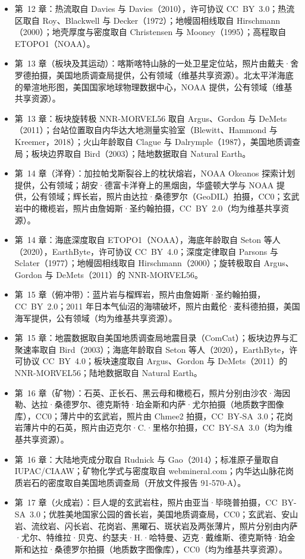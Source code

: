 \begin{itemize}
  \item 第~12 章：热流取自 Davies 与 Davies（2010），许可协议 CC~BY~3.0；热流区取自 Roy、Blackwell 与 Decker（1972）；地幔固相线取自 Hirschmann（2000）；地壳厚度与密度取自 Christensen 与 Mooney（1995）；高程取自 ETOPO1（NOAA）。
  \item 第~13 章（板块及其运动）：喀斯喀特山脉的一处卫星定位站，照片由戴夫·舍罗德拍摄，美国地质调查局提供，公有领域（维基共享资源）。北太平洋海底的晕渲地形图，美国国家地球物理数据中心，NOAA 提供，公有领域（维基共享资源）。
  \item 第~13 章：板块旋转极 NNR-MORVEL56 取自 Argus、Gordon 与 DeMets（2011）；台站位置取自内华达大地测量实验室（Blewitt、Hammond 与 Kreemer，2018）；火山年龄取自 Clague 与 Dalrymple（1987），美国地质调查局；板块边界取自 Bird（2003）；陆地数据取自 Natural Earth。
  \item 第~14 章（洋脊）：加拉帕戈斯裂谷上的枕状熔岩，NOAA Okeanos 探索计划提供，公有领域；胡安·德富卡洋脊上的黑烟囱，华盛顿大学与 NOAA 提供，公有领域；辉长岩，照片由达拉·桑德罗尔（GeoDIL）拍摄，CC0；玄武岩中的橄榄岩，照片由詹姆斯·圣约翰拍摄，CC~BY~2.0（均为维基共享资源）。
  \item 第~14 章：海底深度取自 ETOPO1（NOAA），海底年龄取自 Seton 等人（2020），EarthByte，许可协议 CC~BY~4.0；深度定律取自 Parsons 与 Sclater（1977）；地幔固相线取自 Hirschmann（2000）；旋转极取自 Argus、Gordon 与 DeMets（2011）的 NNR-MORVEL56。
  \item 第~15 章（俯冲带）：蓝片岩与榴辉岩，照片由詹姆斯·圣约翰拍摄，CC~BY~2.0；2011 年日本气仙沼的海啸破坏，照片由戴伦·麦科德拍摄，美国海军提供，公有领域（均为维基共享资源）。
  \item 第~15 章：地震数据取自美国地质调查局地震目录（ComCat）；板块边界与汇聚速率取自 Bird（2003）；海底年龄取自 Seton 等人（2020），EarthByte，许可协议 CC~BY~4.0；板块速度取自 Argus、Gordon 与 DeMets（2011）的 NNR-MORVEL56；陆地数据取自 Natural Earth。
  \item 第~16 章（矿物）：石英、正长石、黑云母和橄榄石，照片分别由沙农·海因勒、达拉·桑德罗尔、德克斯特·珀金斯和内萨·尤尔拍摄（地质数字图像库），CC0；薄片中的玄武岩，照片由 Chmee2 拍摄，CC~BY-SA~3.0；花岗岩薄片中的石英，照片由迈克尔·C.·里格尔拍摄，CC~BY-SA~3.0（均为维基共享资源）。
  \item 第~16 章：大陆地壳成分取自 Rudnick 与 Gao（2014）；标准原子量取自 IUPAC/CIAAW；矿物化学式与密度取自 webmineral.com；内华达山脉花岗质岩石的密度取自美国地质调查局（开放文件报告 91-570-A）。
  \item 第~17 章（火成岩）：巨人堤的玄武岩柱，照片由亚当·毕晓普拍摄，CC~BY-SA~3.0；优胜美地国家公园的酋长岩，美国地质调查局，CC0；玄武岩、安山岩、流纹岩、闪长岩、花岗岩、黑曜石、斑状岩及两张薄片，照片分别由内萨·尤尔、特维拉·贝克、约瑟夫·H.·哈特曼、迈克·戴维斯、德克斯特·珀金斯和达拉·桑德罗尔拍摄（地质数字图像库），CC0（均为维基共享资源）。

\end{itemize}
